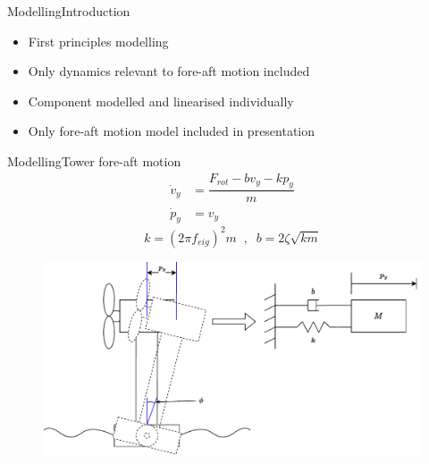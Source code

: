 \begin{frame}{Modelling}{Introduction}
	\begin{itemize}
		\item First principles modelling
		\item Only dynamics relevant to fore-aft motion included
		\item Component modelled and linearised individually
		\item Only fore-aft motion model included in presentation
	\end{itemize}
\end{frame}


\begin{frame}{Modelling}{Tower fore-aft motion}
	\begin{equation}
		\begin{split}
			\dot{v}_y & = \dfrac{F_{rot} - b v_y - k p_y}{m} \\
			\dot{p}_y & = v_y
		\end{split}
	\end{equation}
	\begin{equation}
			k = (2 \pi f_{eig})^2 m \;\; , \;\; b = 2 \zeta \sqrt{k m}
	\end{equation}
	\begin{figure}[ht]
		\centering
		\includegraphics[width=0.9\linewidth]{../Graphics/wtLinForeAftMotionModel.pdf}
		\label{fig:wtLin_fore-aft_diagram}
	\end{figure}
\end{frame}


